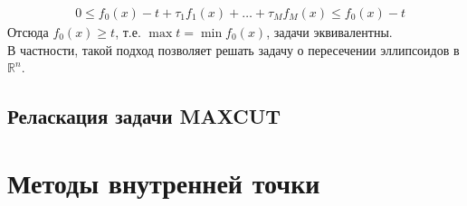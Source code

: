 \documentclass[11pt,a4paper]{report}
\def\Real{\mathbb{R}}
\def\ge{\geqslant}
\theoremstyle{definition}
\theoremstyle{definition}
\theoremstyle{definition}
\begin{document}
\begin{enumerate}
\begin{align*}
			& 0 \leq f_0(x) - t + \tau_1 f_1(x) + \ldots + \tau_Mf_M(x) \leq f_0(x) - t 
		\end{align*}
		Отсюда $ f_{0}(x) \ge t $, т.е. $\max t = \min f_{0}(x)$, задачи эквивалентны.\\
		В частности, такой подход позволяет решать задачу о пересечении эллипсоидов в $ \Real^n $.
	\end{enumerate}
	\subsection{Реласкация задачи MAXCUT}
	\section{Методы внутренней точки}
\end{document}
